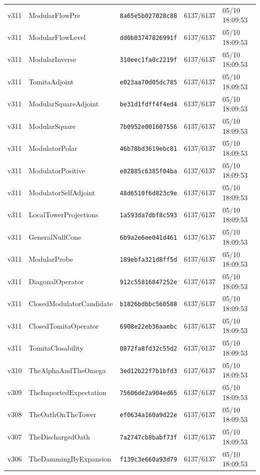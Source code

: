 \documentclass[11pt]{article}
\theoremstyle{definition}\newtheorem{deriv}{Derivação}
\begin{document}
{\begin{longtable}{@{}lllll@{}}
v311 & ModularFlowPre & \texttt{8a65e5b027028c88} & 6137/6137 & 05/10 18:09:53 \\
v311 & ModularFlowLevel & \texttt{dd0b03747826991f} & 6137/6137 & 05/10 18:09:53 \\
v311 & ModularInverse & \texttt{310eec1fa0c2219f} & 6137/6137 & 05/10 18:09:53 \\
v311 & TomitaAdjoint & \texttt{e023aa70d05dc785} & 6137/6137 & 05/10 18:09:53 \\
v311 & ModularSquareAdjoint & \texttt{be31d1fdff4f4ed4} & 6137/6137 & 05/10 18:09:53 \\
v311 & ModularSquare & \texttt{7b0952e001607556} & 6137/6137 & 05/10 18:09:53 \\
v311 & ModulatorPolar & \texttt{46b78bd3619ebc81} & 6137/6137 & 05/10 18:09:53 \\
v311 & ModulatorPositive & \texttt{e82885c6385f04ba} & 6137/6137 & 05/10 18:09:53 \\
v311 & ModulatorSelfAdjoint & \texttt{48d6510f6d823c9e} & 6137/6137 & 05/10 18:09:53 \\
v311 & LocalTowerProjections & \texttt{1a593da7dbf8c593} & 6137/6137 & 05/10 18:09:53 \\
v311 & GeneralNullCone & \texttt{6b9a2e6ee041d461} & 6137/6137 & 05/10 18:09:53 \\
v311 & ModularProbe & \texttt{189ebfa321d8ff5d} & 6137/6137 & 05/10 18:09:53 \\
v311 & DiagonalOperator & \texttt{912c55816847252e} & 6137/6137 & 05/10 18:09:53 \\
v311 & ClosedModulatorCandidate & \texttt{b1826bdbbc560588} & 6137/6137 & 05/10 18:09:53 \\
v311 & ClosedTomitaOperator & \texttt{6908e22eb36aaebc} & 6137/6137 & 05/10 18:09:53 \\
v311 & TomitaClosability & \texttt{0872fa8fd32c55d2} & 6137/6137 & 05/10 18:09:53 \\
v310 & TheAlphaAndTheOmega & \texttt{3ed12b22f7b1bfd3} & 6137/6137 & 05/10 18:09:53 \\
v309 & TheImportedExpectation & \texttt{75606de2a904ed65} & 6137/6137 & 05/10 18:09:53 \\
v308 & TheOathOnTheTower & \texttt{ef0634a160a9d22e} & 6137/6137 & 05/10 18:09:53 \\
v307 & TheDischargedOath & \texttt{7a2747cb8babf73f} & 6137/6137 & 05/10 18:09:53 \\
v306 & TheDammingByExpansion & \texttt{f139c3e660a93d79} & 6137/6137 & 05/10 18:09:53 \\

\end{longtable}}
\end{document}
